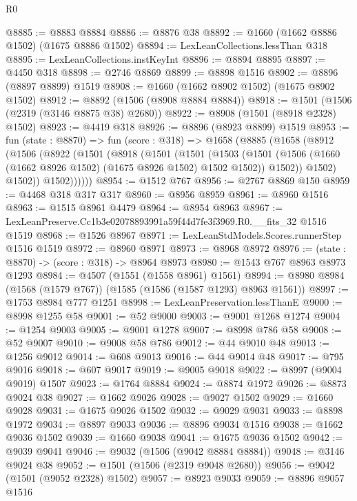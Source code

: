 \begin{lexlean}{R0}
\begin{coremodule}
@8885 := @8883 @8884
@8886 := @8876 @38
@8892 := @1660 (@1662 @8886 @1502) (@1675 @8886 @1502)
@8894 := LexLeanCollections.lessThan @318
@8895 := LexLeanCollections.instKeyInt
@8896 := @8894 @8895
@8897 := @4450 @318
@8898 := @2746 @8869
@8899 := @8898 @1516
@8902 := @8896 (@8897 @8899) @1519
@8908 := @1660 (@1662 @8902 @1502) (@1675 @8902 @1502)
@8912 := @8892 (@1506 (@8908 @8884 @8884))
@8918 := @1501 (@1506 (@2319 (@3146 @8875 @38) @2680))
@8922 := @8908 (@1501 (@8918 @2328) @1502)
@8923 := @4419 @318
@8926 := @8896 (@8923 @8899) @1519
@8953 := fun (state : @8870) =>
  fun (score : @318) =>
  @1658
    (@8885
      (@1658
        (@8912
          (@1506
            (@8922
              (@1501
                (@8918
                  (@1501
                    (@1501
                      (@1503
                        (@1501
                          (@1506 (@1660 (@1662 @8926 @1502) (@1675 @8926 @1502) @1502 @1502))
                          @1502))
                      @1502)
                    @1502))
                @1502))))))
@8954 := @1512 @767
@8956 := @2767 @8869 @150
@8959 := @4468 @318 @317 @317
@8960 := @8956 @8959
@8961 := @8960 @1516
@8963 := @1515 @8961 @4479
@8964 := @8954 @8963
@8967 := LexLeanPreserve.Cc1b3e02078893991a59f44d7fe3f3969.R0.__fits_32 @1516 @1519
@8968 := @1526 @8967
@8971 := LexLeanStdModels.Scores.runnerStep @1516 @1519
@8972 := @8960 @8971
@8973 := @8968 @8972
@8976 := (state : @8870) -> (score : @318) -> @8964 @8973
@8980 := @1543 @767 @8963 @8973 @1293
@8984 := @4507 (@1551 (@1558 @8961) @1561)
@8994 := @8980 @8984 (@1568 (@1579 @767)) (@1585 (@1586 (@1587 @1293) @8963 @1561))
@8997 := @1753 @8984 @777 @1251
@8998 := LexLeanPreservation.lessThanE
@9000 := @8998 @1255 @58
@9001 := @52 @9000
@9003 := @9001 @1268 @1274
@9004 := @1254 @9003
@9005 := @9001 @1278
@9007 := @8998 @786 @58
@9008 := @52 @9007
@9010 := @9008 @58 @786
@9012 := @44 @9010 @48
@9013 := @1256 @9012
@9014 := @608 @9013
@9016 := @44 @9014 @48
@9017 := @795 @9016
@9018 := @607 @9017
@9019 := @9005 @9018
@9022 := @8997 (@9004 @9019) @1507
@9023 := @1764 @8884
@9024 := @8874 @1972
@9026 := @8873 @9024 @38
@9027 := @1662 @9026
@9028 := @9027 @1502
@9029 := @1660 @9028
@9031 := @1675 @9026 @1502
@9032 := @9029 @9031
@9033 := @8898 @1972
@9034 := @8897 @9033
@9036 := @8896 @9034 @1516
@9038 := @1662 @9036 @1502
@9039 := @1660 @9038
@9041 := @1675 @9036 @1502
@9042 := @9039 @9041
@9046 := @9032 (@1506 (@9042 @8884 @8884))
@9048 := @3146 @9024 @38
@9052 := @1501 (@1506 (@2319 @9048 @2680))
@9056 := @9042 (@1501 (@9052 @2328) @1502)
@9057 := @8923 @9033
@9059 := @8896 @9057 @1516

\end{coremodule}
\end{lexlean}
